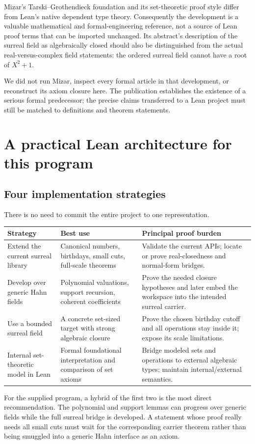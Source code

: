 \documentclass[11pt,letterpaper]{article}
\numberwithin{equation}{section}
\theoremstyle{definition}
\theoremstyle{remark}
\begin{document}
Mizar's Tarski--Grothendieck foundation and its set-theoretic proof style differ from Lean's native dependent type theory. Consequently the development is a valuable mathematical and formal-engineering reference, not a source of Lean proof terms that can be imported unchanged. Its abstract's description of the surreal field as algebraically closed should also be distinguished from the actual real-versus-complex field statements: the ordered surreal field cannot have a root of $X^2+1$.

We did not run Mizar, inspect every formal article in that development, or reconstruct its axiom closure here. The publication establishes the existence of a serious formal predecessor; the precise claims transferred to a Lean project must still be matched to definitions and theorem statements.

\section{A practical Lean architecture for this program}\label{sec:leanarchitecture}

\subsection{Four implementation strategies}
There is no need to commit the entire project to one representation.
\begin{longtable}{@{}P{0.21\textwidth}P{0.34\textwidth}P{0.36\textwidth}@{}}
\toprule
Strategy & Best use & Principal proof burden\\
\midrule\endhead
Extend the current surreal library & Canonical numbers, birthdays, small cuts, full-scale theorems & Validate the current APIs; locate or prove real-closedness and normal-form bridges.\\[0.55em]
Develop over generic Hahn fields & Polynomial valuations, support recursion, coherent coefficients & Prove the needed closure hypotheses and later embed the workspace into the intended surreal carrier.\\[0.55em]
Use a bounded surreal field & A concrete set-sized target with strong algebraic closure & Prove the chosen birthday cutoff and all operations stay inside it; expose its scale limitations.\\[0.55em]
Internal set-theoretic model in Lean & Formal foundational interpretation and comparison of set axioms & Bridge modeled sets and operations to external algebraic types; maintain internal/external semantics.\\
\bottomrule
\end{longtable}
For the supplied program, a hybrid of the first two is the most direct recommendation. The polynomial and support lemmas can progress over generic fields while the full surreal bridge is developed. A statement whose proof really needs all small cuts must wait for the corresponding carrier theorem rather than being smuggled into a generic Hahn interface as an axiom.
\end{document}
